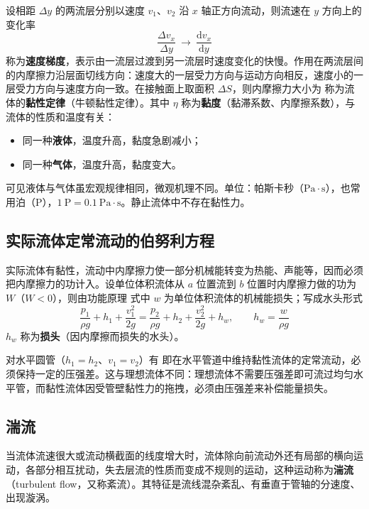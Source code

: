     设相距 $\Delta y$ 的两流层分别以速度 $v_{1}$、$v_{2}$ 沿 $x$ 轴正方向流动，则流速在 $y$ 方向上的变化率
    \[
    \frac{\Delta v_{x}}{\Delta y}\ \longrightarrow\ \frac{\mathrm{d}v_{x}}{\mathrm{d}y}
    \]
    称为\textbf{速度梯度}，表示由一流层过渡到另一流层时速度变化的快慢。作用在两流层间的内摩擦力沿层面切线方向：速度大的一层受力方向与运动方向相反，速度小的一层受力方向与速度方向一致。在接触面上取面积 $\Delta S$，则内摩擦力大小为
    称为流体的\textbf{黏性定律}（牛顿黏性定律）。其中 $\eta$ 称为\textbf{黏度}（黏滞系数、内摩擦系数），与流体的性质和温度有关：
    \begin{itemize}
        \item 同一种\textbf{液体}，温度升高，黏度急剧减小；
        \item 同一种\textbf{气体}，温度升高，黏度变大。
    \end{itemize}
    可见液体与气体虽宏观规律相同，微观机理不同。单位：帕斯卡秒（$\mathrm{Pa\cdot s}$），也常用泊（$\mathrm{P}$），$1\ \mathrm{P}=0.1\ \mathrm{Pa\cdot s}$。静止流体中不存在黏性力。

    \subsection{实际流体定常流动的伯努利方程}
    实际流体有黏性，流动中内摩擦力使一部分机械能转变为热能、声能等，因而必须把内摩擦力的功计入。设单位体积流体从 $a$ 位置流到 $b$ 位置时内摩擦力做的功为 $W$（$W<0$），则由功能原理
    式中 $w$ 为单位体积流体的机械能损失；写成水头形式
    \[
    \frac{p_{1}}{\rho g}+h_{1}+\frac{v_{1}^{2}}{2g}
    =\frac{p_{2}}{\rho g}+h_{2}+\frac{v_{2}^{2}}{2g}+h_{w},
    \qquad h_{w}=\frac{w}{\rho g}
    \]
    $h_{w}$ 称为\textbf{损头}（因内摩擦而损失的水头）。

    对水平圆管（$h_{1}=h_{2}$、$v_{1}=v_{2}$）有
    即在水平管道中维持黏性流体的定常流动，必须保持一定的压强差。这与理想流体不同：理想流体不需要压强差即可流过均匀水平管，而黏性流体因受管壁黏性力的拖拽，必须由压强差来补偿能量损失。

    \subsection{湍流}
    当流体流速很大或流动横截面的线度增大时，流体除向前流动外还有局部的横向运动，各部分相互扰动，失去层流的性质而变成不规则的运动，这种运动称为\textbf{湍流}（turbulent flow，又称紊流）。其特征是流线混杂紊乱、有垂直于管轴的分速度、出现漩涡。

